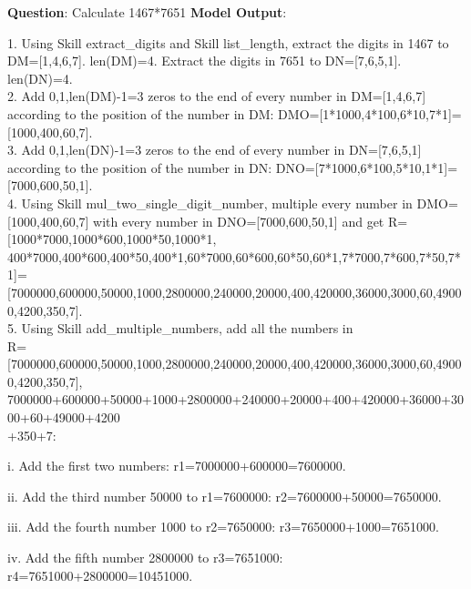 \documentclass{article} \usepackage{arxiv}
\begin{document}
\noindent\begin{minipage}{\textwidth}
 \label{Tab:example_simple_add_skill}
\end{minipage}


\newpage


\begin{tcolorbox}[title = {Multiplication}, colback = Apricot!25!white, colframe = BrickRed!75!black,] 
\textbf{Question}: Calculate 1467*7651
\tcblower
\textbf{Model Output}:

\quad

1. Using Skill extract\_digits and Skill list\_length, extract the digits in 1467 to DM=[1,4,6,7]. len(DM)=4. Extract the digits in 7651 to DN=[7,6,5,1]. len(DN)=4. \\ 
2. Add 0,1,len(DM)-1=3 zeros to the end of every number in DM=[1,4,6,7] according to the position of the number in DM: DMO=[1*1000,4*100,6*10,7*1]=[1000,400,60,7]. \\
3. Add 0,1,len(DN)-1=3 zeros to the end of every number in DN=[7,6,5,1] according to the position of the number in DN: DNO=[7*1000,6*100,5*10,1*1]=[7000,600,50,1]. \\
4. Using Skill mul\_two\_single\_digit\_number, multiple every number in DMO=[1000,400,60,7] with  every number in DNO=[7000,600,50,1]  and get R=[1000*7000,1000*600,1000*50,1000*1, 400*7000,400*600,400*50,400*1,60*7000,60*600,60*50,60*1,7*7000,7*600,7*50,7*1]=  [7000000,600000,50000,1000,2800000,240000,20000,400,420000,36000,3000,60,49000,4200,350,7]. \\
5. Using Skill add\_multiple\_numbers, add all the numbers  in \\ R=[7000000,600000,50000,1000,2800000,240000,20000,400,420000,36000,3000,60,49000,4200,350,7], 7000000+600000+50000+1000+2800000+240000+20000+400+420000+36000+3000+60+49000+4200\\+350+7: 

\quad 

    \qquad i. Add the first two numbers: r1=7000000+600000=7600000. 
    
    \qquad ii. Add the third number 50000 to r1=7600000: r2=7600000+50000=7650000. 
    
    \qquad iii. Add the fourth number 1000 to r2=7650000: r3=7650000+1000=7651000. 
    
    \qquad iv. Add the fifth number 2800000 to r3=7651000: r4=7651000+2800000=10451000. 
    

\end{tcolorbox}
\end{document}
